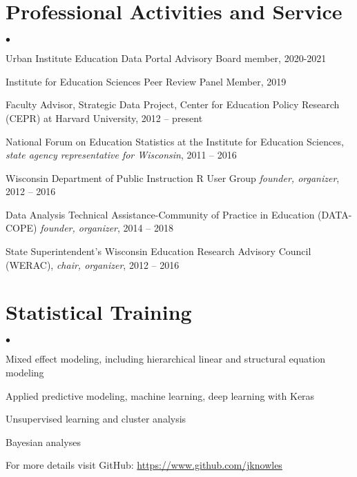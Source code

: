 \documentclass[margin,line]{res}
\newenvironment{list2}{
  \begin{list}{$\bullet$}{%
      \setlength{\itemsep}{0in}
      \setlength{\parsep}{0in} \setlength{\parskip}{0in}
      \setlength{\topsep}{0in} \setlength{\partopsep}{0in} 
      \setlength{\leftmargin}{0.2in}}}{\end{list}}
\begin{document}
\begin{resume}
\section{\sc Professional Activities and Service}
% 
\begin{list2}
\item Urban Institute Education Data Portal Advisory Board member, 2020-2021
\item Institute for Education Sciences Peer Review Panel Member, 2019
\item Faculty Advisor, Strategic Data Project, Center for Education Policy Research (CEPR) at Harvard University, 2012 -- present
\item National Forum on Education Statistics at the Institute for Education Sciences, \emph{state agency representative for Wisconsin}, 2011 -- 2016
\item Wisconsin Department of Public Instruction R User Group \emph{founder, organizer}, 
2012 -- 2016 
\item Data Analysis Technical Assistance-Community of Practice in Education 
(DATA-COPE) \emph{founder, organizer}, 2014 -- 2018
\item State Superintendent's Wisconsin Education Research Advisory Council (WERAC), 
\emph{chair, organizer}, 2012 -- 2016
\end{list2}

\vspace{-2mm}

\section{\sc Statistical Training}
\begin{list2}
\item Mixed effect modeling, including hierarchical linear and structural equation modeling
\item Applied predictive modeling, machine learning, deep learning with Keras
\item Unsupervised learning and cluster analysis
\item Bayesian analyses
\item For more details visit GitHub: \url{https://www.github.com/jknowles}\\
\end{list2}

\vspace{-2mm}

% 


\end{resume}
\end{document}
